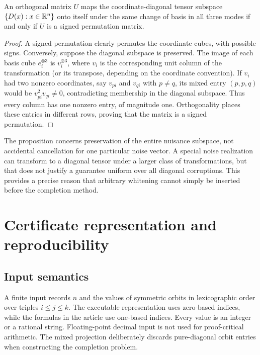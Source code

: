 \begin{proposition}\label{prop:mask-symmetry}
An orthogonal matrix $U$ maps the coordinate-diagonal tensor subspace $\{D(x):x\in\mathbb R^n\}$ onto itself under the same change of basis in all three modes if and only if $U$ is a signed permutation matrix.
\end{proposition}
\begin{samepage}
\begin{proof}
A signed permutation clearly permutes the coordinate cubes, with possible signs. Conversely, suppose the diagonal subspace is preserved. The image of each basis cube $e_i^{\otimes3}$ is $v_i^{\otimes3}$, where $v_i$ is the corresponding unit column of the transformation (or its transpose, depending on the coordinate convention). If $v_i$ had two nonzero coordinates, say $v_{pi}$ and $v_{qi}$ with $p\ne q$, its mixed entry $(p,p,q)$ would be $v_{pi}^2v_{qi}\ne0$, contradicting membership in the diagonal subspace. Thus every column has one nonzero entry, of magnitude one. Orthogonality places these entries in different rows, proving that the matrix is a signed permutation.
\end{proof}
\par
\end{samepage}

The proposition concerns preservation of the entire nuisance subspace, not accidental cancellation for one particular noise vector. A special noise realization can transform to a diagonal tensor under a larger class of transformations, but that does not justify a guarantee uniform over all diagonal corruptions. This provides a precise reason that arbitrary whitening cannot simply be inserted before the completion method.

\section{Certificate representation and reproducibility}\label{app:representation}
\subsection{Input semantics}
A finite input records $n$ and the values of symmetric orbits in lexicographic order over triples $i\le j\le k$. The executable representation uses zero-based indices, while the formulas in the article use one-based indices. Every value is an integer or a rational string. Floating-point decimal input is not used for proof-critical arithmetic. The mixed projection deliberately discards pure-diagonal orbit entries when constructing the completion problem.

